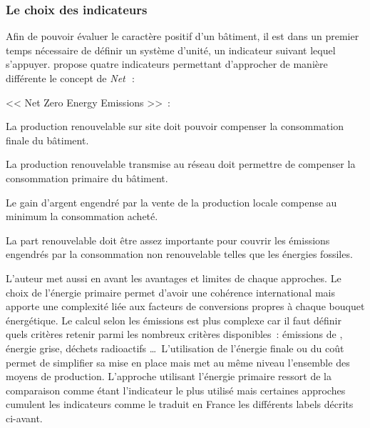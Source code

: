 \subsubsection{Le choix des indicateurs} %
\label{ssub:le_choix_des_indicateurs}
Afin de pouvoir évaluer le caractère positif d’un bâtiment, il est dans un premier
temps nécessaire de définir un système d’unité, un indicateur suivant lequel
s’appuyer. \textcite{Torcellini2006} propose quatre indicateurs permettant
d’approcher de manière différente le concept de \textit{Net}\,~:
\begin{blockdescription}{<< Net Zero Energy Emissions >>~:}
    \item[\enquote{Net Zero Site Energy}~:] La production renouvelable sur site
          doit pouvoir compenser la consommation finale du bâtiment.
    \item[\enquote{Net Zero Source Energy}~:] La production renouvelable transmise au réseau
          doit permettre de compenser la consommation primaire du bâtiment.
    \item[\enquote{Net Zero Energy Costs}~:] Le gain d’argent engendré par la vente
           de la production locale compense au minimum la consommation acheté.
    \item[\enquote{Net Zero Energy Emissions}~:] La part renouvelable doit être assez
           importante pour couvrir les émissions engendrés par la consommation non
           renouvelable telles que les énergies fossiles.
\end{blockdescription}
L’auteur met aussi en avant les avantages et limites de chaque approches. Le choix de
l’énergie primaire permet d’avoir une cohérence international mais apporte une complexité
liée aux facteurs de conversions propres à chaque bouquet énergétique. Le calcul selon les
émissions est plus complexe car il faut définir quels critères retenir parmi les nombreux
critères disponibles~: émissions de , énergie grise, déchets radioactifs
\dots\ L’utilisation de l’énergie finale ou du coût permet de simplifier sa mise en place
mais met au même niveau l’ensemble des moyens de production. L’approche utilisant
l’énergie primaire ressort de la comparaison comme étant l’indicateur le plus utilisé mais
certaines approches cumulent les indicateurs comme le traduit en France les différents
labels décrits ci-avant.


